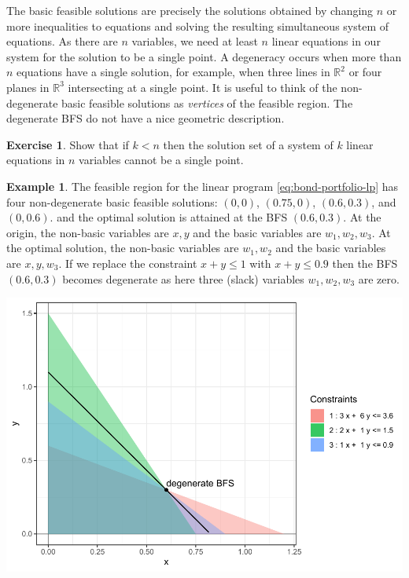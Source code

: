\documentclass[
]{book}
\theoremstyle{definition}
\theoremstyle{definition}
\newtheorem{example}{Example}[chapter]
\theoremstyle{definition}
\newtheorem{exercise}{Exercise}[chapter]
\theoremstyle{definition}
\theoremstyle{remark}
\begin{document}
The basic feasible solutions are precisely the solutions obtained by changing \(n\) or more inequalities to equations and solving the resulting simultaneous system of equations. As there are \(n\) variables, we need at least \(n\) linear equations in our system for the solution to be a single point. A degeneracy occurs when more than \(n\) equations have a single solution, for example, when three lines in \(\mathbb{R}^2\) or four planes in \(\mathbb{R}^3\) intersecting at a single point.
It is useful to think of the non-degenerate basic feasible solutions as \emph{vertices} of the feasible region.
The degenerate BFS do not have a nice geometric description.

\begin{exercise}
Show that if \(k < n\) then the solution set of a system of \(k\) linear equations in \(n\) variables cannot be a single point.
\end{exercise}

\begin{example}
The feasible region for the linear program \eqref{eq:bond-portfolio-lp} has four non-degenerate basic feasible solutions: \((0,0)\), \((0.75, 0)\), \((0.6, 0.3)\), and \((0, 0.6)\). and the optimal solution is attained at the BFS \((0.6, 0.3)\). At the origin, the non-basic variables are \(x, y\) and the basic variables are \(w_1, w_2, w_3\). At the optimal solution, the non-basic variables are \(w_1, w_2\) and the basic variables are \(x, y, w_3\). If we replace the constraint \(x + y \le 1\) with \(x + y \le 0.9\) then the BFS \((0.6, 0.3)\) becomes degenerate as here three (slack) variables \(w_1, w_2, w_3\) are zero.

\includegraphics{Introduction-to-Optimization_files/figure-latex/fig-bond-portfolio-degenerate-1.pdf}
\end{example}
\end{document}
